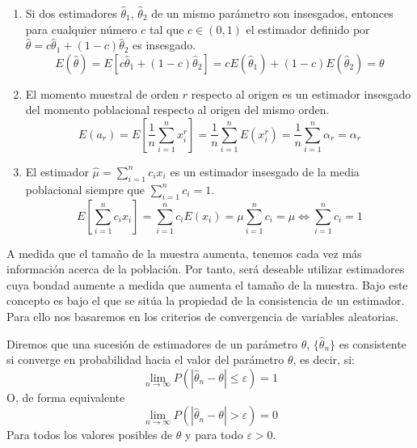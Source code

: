 \begin{enumerate}
\item Si dos estimadores $\hat{\theta}_1$, $\hat{\theta}_2$ de un mismo par\'ametro son insesgados, entonces para cualquier n\'umero $c$ tal que $c\in(0,1)$ el estimador definido por $\hat{\theta}=c\hat{\theta}_1+(1-c)\hat{\theta}_2$ es insesgado.
\begin{equation*}
E(\hat{\theta})=E\left[c\hat{\theta}_1+(1-c)\hat{\theta}_2\right]=cE(\hat{\theta}_1)+(1-c)E(\hat{\theta}_2)=\theta
\end{equation*}

\item El momento muestral de orden $r$ respecto al origen es un estimador insesgado del momento poblacional respecto al origen del mismo orden.
\begin{equation*}
E(a_r)=E\left[\frac{1}{n}\sum_{i=1}^nx_i^r\right]=\frac{1}{n}\sum_{i=1}^nE(x_i^r)=\frac{1}{n}\sum_{i=1}^n\alpha_r=\alpha_r
\end{equation*}

\item El estimador $\hat{\mu}=\sum_{i=1}^nc_ix_i$ es un estimador insesgado de la media poblacional siempre que $\sum_{i=1}^nc_i=1$.
\begin{equation*}
E\left[\sum_{i=1}^nc_ix_i\right]=\sum_{i=1}^nc_iE(x_i)=\mu\sum_{i=1}^nc_i=\mu \Leftrightarrow \sum_{i=1}^nc_i=1
\end{equation*}

\end{enumerate}


A medida que el tama\~no de la muestra aumenta, tenemos cada vez m\'as informaci\'on acerca de la poblaci\'on. Por tanto, ser\'a deseable utilizar estimadores cuya bondad aumente a medida que aumenta el tama\~no de la muestra. Bajo este concepto es bajo el que se sit\'ua la propiedad de la consistencia de un estimador. Para ello nos basaremos en los criterios de convergencia de variables aleatorias.

\begin{definicion}
Diremos que una sucesi\'on de estimadores de un par\'ametro $\theta$, $\{\hat{\theta}_n\}$ es consistente si converge en probabilidad hacia el valor del par\'ametro $\theta$, es decir, si:
\begin{equation*}
\lim_{n\to\infty}P\left(\left|\hat{\theta}_n-\theta\right|\leq\varepsilon\right)=1
\end{equation*}
O, de forma equivalente
\begin{equation*}
\lim_{n\to\infty}P\left(\left|\hat{\theta}_n-\theta\right|>\varepsilon\right)=0
\end{equation*}
Para todos los valores posibles de $\theta$ y para todo $\varepsilon>0$.
\end{definicion}

